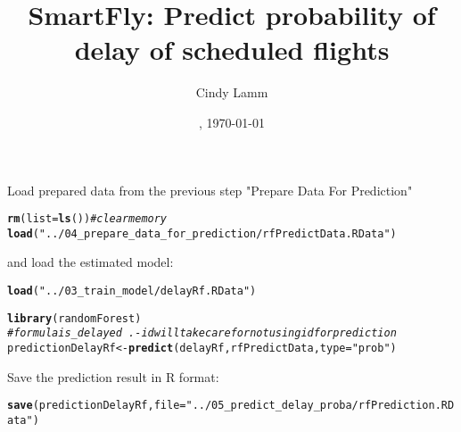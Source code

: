 \documentclass{article}\usepackage[]{graphicx}\usepackage[]{color}
\makeatletter
\newcommand{\hlstr}[1]{\textcolor[rgb]{0.192,0.494,0.8}{#1}}%
\newcommand{\hlcom}[1]{\textcolor[rgb]{0.678,0.584,0.686}{\textit{#1}}}%
\newcommand{\hlstd}[1]{\textcolor[rgb]{0.345,0.345,0.345}{#1}}%
\newcommand{\hlkwb}[1]{\textcolor[rgb]{0.69,0.353,0.396}{#1}}%
\newcommand{\hlkwc}[1]{\textcolor[rgb]{0.333,0.667,0.333}{#1}}%
\newcommand{\hlkwd}[1]{\textcolor[rgb]{0.737,0.353,0.396}{\textbf{#1}}}%
\newenvironment{kframe}{%
 \def\at@end@of@kframe{}%
 \ifinner\ifhmode%
  \def\at@end@of@kframe{\end{minipage}}%
  \begin{minipage}{\columnwidth}%
 \fi\fi%
 \def\FrameCommand##1{\hskip\@totalleftmargin \hskip-\fboxsep
 \colorbox{shadecolor}{##1}\hskip-\fboxsep
     \hskip-\linewidth \hskip-\@totalleftmargin \hskip\columnwidth}%
 \MakeFramed {\advance\hsize-\width
   \@totalleftmargin\z@ \linewidth\hsize
   \@setminipage}}%
 {\par\unskip\endMakeFramed%
 \at@end@of@kframe}
\newenvironment{knitrout}{}{} %
\makeatother
\begin{document}
\date{\currenttime, \today}
\title{SmartFly: Predict probability of delay of scheduled flights}
\author{Cindy Lamm}

\maketitle

Load prepared data from the previous step "Prepare Data For Prediction"
\begin{knitrout}
\color{fgcolor}\begin{kframe}
\begin{alltt}
\hlkwd{rm}\hlstd{(}\hlkwc{list}\hlstd{=}\hlkwd{ls}\hlstd{())}   \hlcom{#clear memory}
\hlkwd{load}\hlstd{(}\hlstr{"../04_prepare_data_for_prediction/rfPredictData.RData"}\hlstd{)}
\end{alltt}
\end{kframe}
\end{knitrout}

and load the estimated model:
\begin{knitrout}
\color{fgcolor}\begin{kframe}
\begin{alltt}
\hlkwd{load}\hlstd{(}\hlstr{"../03_train_model/delayRf.RData"}\hlstd{)}
\end{alltt}
\end{kframe}
\end{knitrout}

\begin{knitrout}
\color{fgcolor}\begin{kframe}
\begin{alltt}
\hlkwd{library}\hlstd{(randomForest)}
\hlcom{# formula is_delayed ~ . - id will take care for not using id for prediction}
\hlstd{predictionDelayRf} \hlkwb{<-} \hlkwd{predict}\hlstd{(delayRf, rfPredictData,} \hlkwc{type}\hlstd{=}\hlstr{"prob"}\hlstd{)}
\end{alltt}
\end{kframe}
\end{knitrout}


Save the prediction result in R format:
\begin{knitrout}
\color{fgcolor}\begin{kframe}
\begin{alltt}
\hlkwd{save}\hlstd{(predictionDelayRf,} \hlkwc{file}\hlstd{=}\hlstr{"../05_predict_delay_proba/rfPrediction.RData"}\hlstd{)}
\end{alltt}
\end{kframe}
\end{knitrout}
\end{document}
